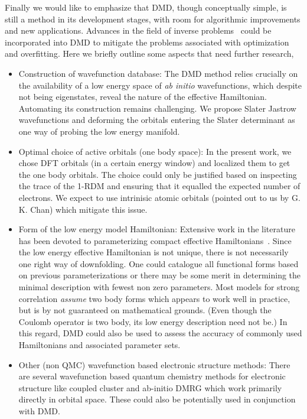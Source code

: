 Finally we would like to emphasize that DMD, though conceptually simple, 
is still a method in its development stages, with room for algorithmic improvements and new applications. 
Advances in the field of inverse problems~\cite{Berg2017} could be incorporated into DMD to 
mitigate the problems associated with optimization and overfitting. 
Here we briefly outline some aspects that need further research,
\begin{itemize} 
	\item Construction of wavefunction database:
	The DMD method relies crucially on the availability of a low energy space of \textit{ab initio} wavefunctions, 
	which despite not being eigenstates, reveal the nature of the effective Hamiltonian. Automating its construction 
	remains challenging. We propose Slater Jastrow wavefunctions and deforming the orbitals entering the Slater 
	determinant as one way of probing the low energy manifold.
	\item Optimal choice of active orbitals (one body space):
	In the present work, we chose DFT orbitals (in a certain energy window) and localized them to get the one body orbitals. 
	The choice could only be justified based on inspecting the trace of the 1-RDM and ensuring that it 
	equalled the expected number of electrons. We expect to use intrinisic atomic orbitals (pointed out to us by G. K. Chan) which 
	mitigate this issue. 
	\item Form of the low energy model Hamiltonian:
	Extensive work in the literature has been devoted to parameterizing compact effective Hamiltonians~\cite{Georges, Oles, Coury}. 
	Since the low energy effective Hamiltonian is not unique, there is not necessarily one right way of downfolding. 
	One could catalogue all functional forms based on previous parameterizations 
	or there may be some merit in determining the minimal description with fewest non zero parameters.
	Most models for strong correlation \textit{assume} two body forms which appears to work well in practice, 
	but is by not guaranteed on mathematical grounds. (Even though the Coulomb operator is two body, 
	its low energy description need not be.) In this regard, DMD could also be used to assess 
	the accuracy of commonly used Hamiltonians and associated parameter sets.
	\item Other (non QMC) wavefunction based electronic structure methods:
	There are several wavefunction based quantum chemistry 
	methods for electronic structure like coupled cluster and ab-initio DMRG which work primarily 
	directly in orbital space. These could also be potentially used in conjunction with DMD.
\end{itemize} 

